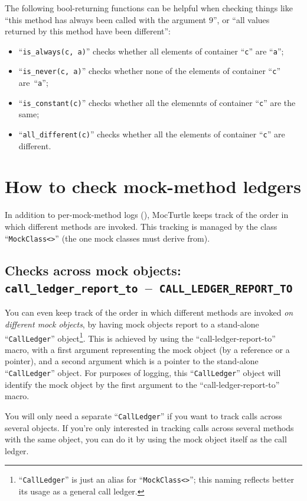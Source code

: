 \documentclass[twoside, a4paper, article]{memoir}
\newcommand*\testudocolor{\color{red!80!blue}}
\newcommand*\testudo[1]{\texttt{\testudocolor{}#1}}
\newcommand*\testudopair[2]{\testudo{#1}~--~\testudo{#2}}
\newcommand\subsectiontestudopair[3]{%
  \subsection[#1]{#1: \testudopair{#2}{#3}}}
\begin{document}
The following bool-returning functions can be helpful when checking things like
``this method has always been called with the argument $9$'', or ``all values
returned by this method have been different'':
\begin{itemize}
\item ``\texttt{is\_always(c, a)}'' checks whether all elements of container
  ``\texttt{c}'' are ``\texttt{a}'';
\item ``\texttt{is\_never(c, a)}'' checks whether none of the elements of
  container ``\texttt{c}'' are~``\texttt{a}'';
\item ``\texttt{is\_constant(c)}'' checks whether all the elemennts of
  container ``\texttt{c}'' are the same;
\item ``\texttt{all\_different(c)}'' checks whether all the elements of
  container ``\texttt{c}'' are different.
\end{itemize}

\section{How to check mock-method ledgers}
\label{sec:check-mock-method-ledgers}

In addition to per-mock-method logs (),
MocTurtle keeps track of the order in which different methods are invoked.
This tracking is managed by the class ``\texttt{MockClass<>}'' (the one mock
classes must derive from).

\subsectiontestudopair{Checks across mock objects}%
  {call\_ledger\_report\_to}{CALL\_LEDGER\_REPORT\_TO}
\label{sec:check-mock-method-ledgers-across-mock-objects}

You can even keep track of the order in which different methods are invoked
\emph{on different mock objects}, by having mock objects report to a
stand-alone ``\texttt{CallLedger}''
object\footnote{``\texttt{CallLedger}'' is just an alias for
  ``\texttt{MockClass<>}''; this naming reflects better its usage as a
  general call ledger.}.
This is achieved by using the ``call-ledger-report-to'' macro, with a first
argument representing the mock object (by a reference or a pointer), and a
second argument which is a pointer to the stand-alone ``\texttt{CallLedger}''
object.  For purposes of logging, this ``\texttt{CallLedger}'' object will
identify the mock object by the first argument to the ``call-ledger-report-to''
macro.

You will only need a separate ``\texttt{CallLedger}'' if you want to
track calls across several objects.  If you're only interested in tracking
calls across several methods with the same object, you can do it by using the
mock object itself as the call ledger.
\end{document}
